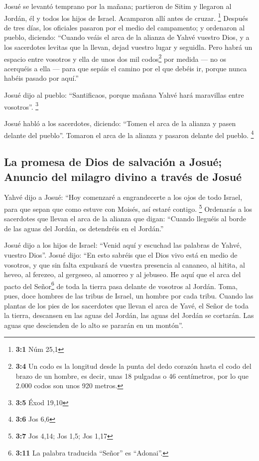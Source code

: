 \begin{paracol}{2}
 Josué se levantó temprano por la mañana; partieron de
Sitim y llegaron al Jordán, él y todos los hijos de Israel. Acamparon
allí antes de cruzar. \footnote{\textbf{3:1} Núm 25,1} 
Después de tres días, los oficiales pasaron por el medio del campamento;
 y ordenaron al pueblo, diciendo: ``Cuando veáis el arca
de la alianza de Yahvé vuestro Dios, y a los sacerdotes levitas que la
llevan, dejad vuestro lugar y seguidla.  Pero habrá un
espacio entre vosotros y ella de unos dos mil codos\footnote{\textbf{3:4}
  Un codo es la longitud desde la punta del dedo corazón hasta el codo
  del brazo de un hombre, es decir, unas 18 pulgadas o 46 centímetros,
  por lo que 2.000 codos son unos 920 metros.} por medida --- no os
acerquéis a ella --- para que sepáis el camino por el que debéis ir,
porque nunca habéis pasado por aquí.''

 Josué dijo al pueblo: ``Santificaos, porque mañana Yahvé
hará maravillas entre vosotros''. \footnote{\textbf{3:5} Éxod 19,10}

 Josué habló a los sacerdotes, diciendo: ``Tomen el arca
de la alianza y pasen delante del pueblo''. Tomaron el arca de la
alianza y pasaron delante del pueblo. \footnote{\textbf{3:6} Jos 6,6}

\hypertarget{la-promesa-de-dios-de-salvaciuxf3n-a-josuuxe9-anuncio-del-milagro-divino-a-travuxe9s-de-josuuxe9}{%
\subsection{La promesa de Dios de salvación a Josué; Anuncio del milagro
divino a través de
Josué}\label{la-promesa-de-dios-de-salvaciuxf3n-a-josuuxe9-anuncio-del-milagro-divino-a-travuxe9s-de-josuuxe9}}

 Yahvé dijo a Josué: ``Hoy comenzaré a engrandecerte a los
ojos de todo Israel, para que sepan que como estuve con Moisés, así
estaré contigo. \footnote{\textbf{3:7} Jos 4,14; Jos 1,5; Jos 1,17}
 Ordenarás a los sacerdotes que llevan el arca de la
alianza que digan: ``Cuando lleguéis al borde de las aguas del Jordán,
os detendréis en el Jordán.''

 Josué dijo a los hijos de Israel: ``Venid aquí y escuchad
las palabras de Yahvé, vuestro Dios''.  Josué dijo: ``En
esto sabréis que el Dios vivo está en medio de vosotros, y que sin falta
expulsará de vuestra presencia al cananeo, al hitita, al heveo, al
ferezeo, al gergeseo, al amorreo y al jebuseo.  He aquí
que el arca del pacto del Señor\footnote{\textbf{3:11} La palabra
  traducida ``Señor'' es ``Adonai''.} de toda la tierra pasa delante de
vosotros al Jordán.  Toma, pues, doce hombres de las
tribus de Israel, un hombre por cada tribu.  Cuando las
plantas de los pies de los sacerdotes que llevan el arca de Yavé, el
Señor de toda la tierra, descansen en las aguas del Jordán, las aguas
del Jordán se cortarán. Las aguas que descienden de lo alto se pararán
en un montón''.


\end{paracol}

